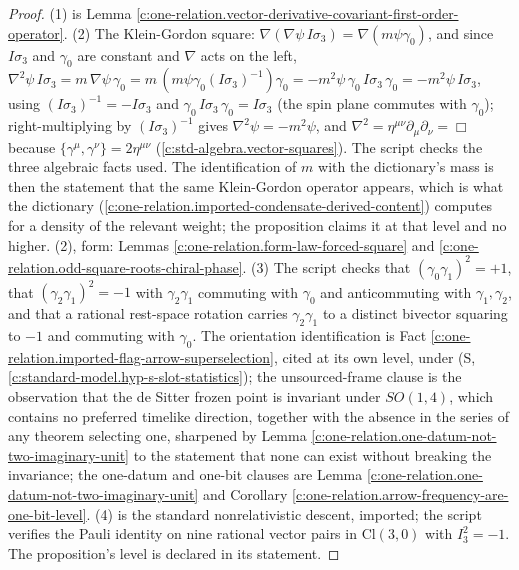 \documentclass[11pt]{article}
\theoremstyle{definition}
\theoremstyle{plain}
\providecommand{\Cl}{}\renewcommand{\Cl}{\mathrm{Cl}}
\begin{document}
\begin{proof}
(1) is Lemma \ref{c:one-relation.vector-derivative-covariant-first-order-operator}. (2) The Klein-Gordon square: $\nabla(\nabla\psi\,I\sigma_{3}) = \nabla(m\psi\gamma_{0})$, and since $I\sigma_{3}$ and $\gamma_{0}$ are constant and $\nabla$ acts on the left, $\nabla^{2}\psi\, I\sigma_{3} = m\,\nabla\psi\,\gamma_{0} = m\,(m\psi\gamma_{0}(I\sigma_{3})^{-1})\gamma_{0} = -m^{2}\psi\,\gamma_{0}\,I\sigma_{3}\,\gamma_{0} = -m^{2}\psi\, I\sigma_{3}$, using $(I\sigma_{3})^{-1} = -I\sigma_{3}$ and $\gamma_{0}\,I\sigma_{3}\,\gamma_{0} = I\sigma_{3}$ (the spin plane commutes with $\gamma_{0}$); right-multiplying by $(I\sigma_{3})^{-1}$ gives $\nabla^{2}\psi = -m^{2}\psi$, and $\nabla^{2} = \eta^{\mu\nu}\partial_{\mu}\partial_{\nu} = \Box$ because $\{\gamma^{\mu}, \gamma^{\nu}\} = 2\eta^{\mu\nu}$ (\ref{c:std-algebra.vector-squares}). The script checks the three algebraic facts used. The identification of $m$ with the dictionary's mass is then the statement that the same Klein-Gordon operator appears, which is what the dictionary (\ref{c:one-relation.imported-condensate-derived-content}) computes for a density of the relevant weight; the proposition claims it at that level and no higher. (2), form: Lemmas \ref{c:one-relation.form-law-forced-square} and \ref{c:one-relation.odd-square-roots-chiral-phase}. (3) The script checks that $(\gamma_{0}\gamma_{1})^{2} = +1$, that $(\gamma_{2}\gamma_{1})^{2} = -1$ with $\gamma_{2}\gamma_{1}$ commuting with $\gamma_{0}$ and anticommuting with $\gamma_{1}, \gamma_{2}$, and that a rational rest-space rotation carries $\gamma_{2}\gamma_{1}$ to a distinct bivector squaring to $-1$ and commuting with $\gamma_{0}$. The orientation identification is Fact \ref{c:one-relation.imported-flag-arrow-superselection}, cited at its own level, under (S, \ref{c:standard-model.hyp-s-slot-statistics}); the unsourced-frame clause is the observation that the de Sitter frozen point is invariant under $SO(1,4)$, which contains no preferred timelike direction, together with the absence in the series of any theorem selecting one, sharpened by Lemma \ref{c:one-relation.one-datum-not-two-imaginary-unit} to the statement that none can exist without breaking the invariance; the one-datum and one-bit clauses are Lemma \ref{c:one-relation.one-datum-not-two-imaginary-unit} and Corollary \ref{c:one-relation.arrow-frequency-are-one-bit-level}. (4) is the standard nonrelativistic descent, imported; the script verifies the Pauli identity on nine rational vector pairs in $\Cl(3,0)$ with $I_{3}^{2} = -1$. The proposition's level is declared in its statement.

\end{proof}
\end{document}
